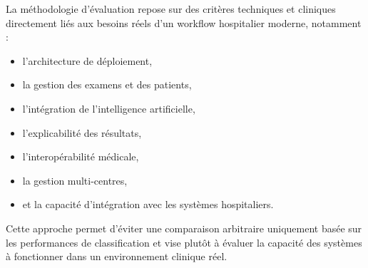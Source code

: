 \documentclass[12pt,a4paper,oneside]{report}
\begin{document}
La méthodologie d'évaluation repose sur des critères techniques et cliniques directement liés aux besoins réels d'un workflow hospitalier moderne, notamment :
\begin{itemize}
    \item l'architecture de déploiement,
    \item la gestion des examens et des patients,
    \item l'intégration de l'intelligence artificielle,
    \item l'explicabilité des résultats,
    \item l'interopérabilité médicale,
    \item la gestion multi-centres,
    \item et la capacité d'intégration avec les systèmes hospitaliers.
\end{itemize}

Cette approche permet d'éviter une comparaison arbitraire uniquement basée sur les performances de classification et vise plutôt à évaluer la capacité des systèmes à fonctionner dans un environnement clinique réel.
\end{document}

